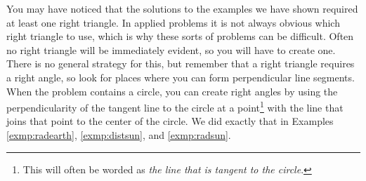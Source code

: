 \divider\vspace{-2mm}
\newpage
You may have noticed that the solutions to the examples we have shown required at least one right
triangle. In applied problems it is not always obvious which right triangle to use, which is why
these sorts of problems can be difficult. Often no right triangle will be immediately evident, so
you will have to create one. There is no general strategy for this, but remember that a right
triangle requires a right angle, so look for places where you can form perpendicular line segments.
When the problem contains a circle, you can create right angles by using the perpendicularity of
the tangent line to the circle at a point\footnote{This will often be worded as
\emph{the line that is tangent to the circle}.} with the line that joins that point to the center of
the circle. We did exactly that in Examples \ref{exmp:radearth}, \ref{exmp:distsun}, and
\ref{exmp:radsun}.

